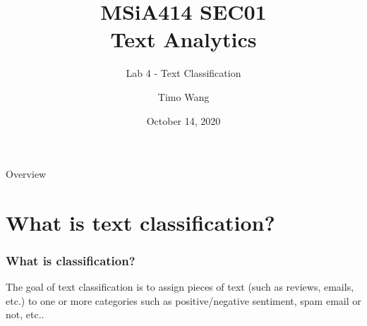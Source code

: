\documentclass{beamer}
\begin{document}
\title{MSiA414 SEC01\\ Text Analytics}
\subtitle{Lab 4 - Text Classification}
\author{Timo Wang}
\date{October 14, 2020}

\begin{frame}
    \titlepage
\end{frame}

\begin{frame}{Overview}
    \tableofcontents[hideallsubsections]
\end{frame}

\section{What is text classification?}
\begin{frame}
    \frametitle{What is classification?}
    The goal of text classification is to assign pieces of text (such as reviews, emails, etc.) to one or more categories such as positive/negative sentiment, spam email or not, etc.. 
\end{frame}
\end{document}
